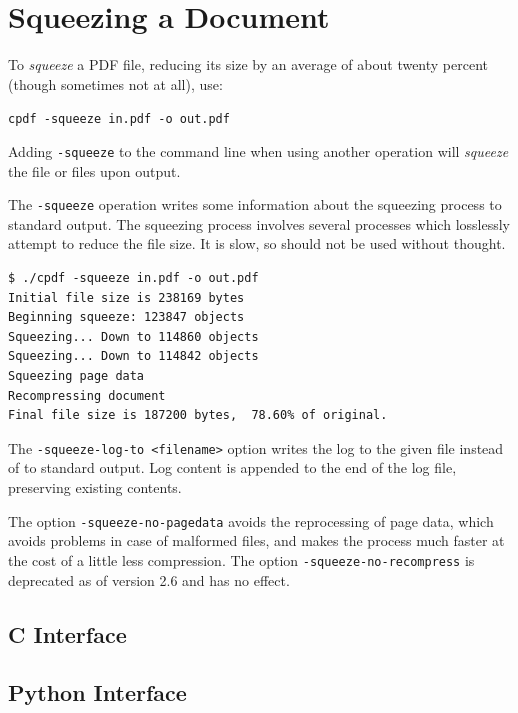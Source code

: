 \documentclass{book}
\begin{document}
  \section{Squeezing a Document}
  To \textit{squeeze} a PDF file, reducing its size by an average of about twenty percent (though sometimes not at all), use:
  \begin{framed}
    \noindent\small\verb!cpdf -squeeze in.pdf -o out.pdf!
  \end{framed}
  \noindent Adding \texttt{-squeeze} to the command line when using another operation will \textit{squeeze} the file or files upon output.
  
  The \texttt{-squeeze} operation writes some information about the squeezing process to standard output. The squeezing process involves several processes which losslessly attempt to reduce the file size. It is slow, so should not be used without thought.

\begin{verbatim}
$ ./cpdf -squeeze in.pdf -o out.pdf
Initial file size is 238169 bytes
Beginning squeeze: 123847 objects
Squeezing... Down to 114860 objects
Squeezing... Down to 114842 objects
Squeezing page data
Recompressing document
Final file size is 187200 bytes,  78.60% of original.
\end{verbatim}

\noindent The \texttt{-squeeze-log-to <filename>} option writes the log to the given file instead of to standard output. Log content is appended to the end of the log file, preserving existing contents.

The option \texttt{-squeeze-no-pagedata} avoids the reprocessing of page data, which avoids problems in case of malformed files, and makes the process much faster at the cost of a little less compression. The option \texttt{-squeeze-no-recompress} is deprecated as of version 2.6 and has no effect.

\begin{cpdflib}
\clearpage
\section*{C Interface}
\begin{small}\tt

\end{small}
\end{cpdflib}

\begin{pycpdflib}
\clearpage
\section*{Python Interface}
\begin{small}\tt

\end{small}
\end{pycpdflib}
\end{document}
